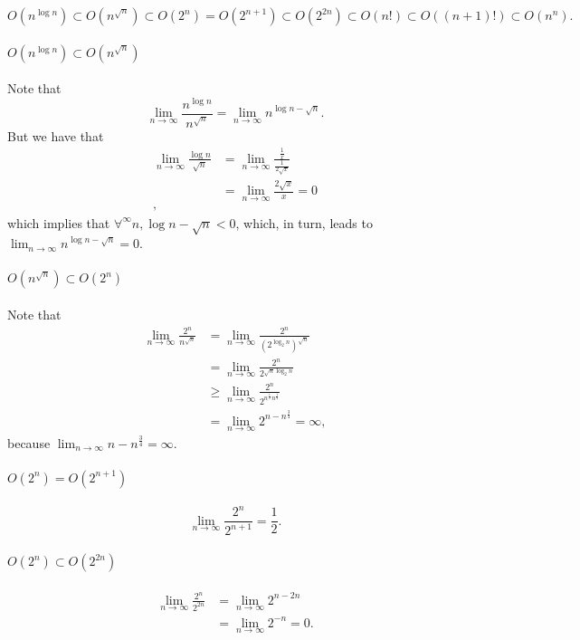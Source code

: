 \[
O(n^{\log n}) \subset O(n^{\sqrt{n}}) \subset O(2^{n}) = O(2^{n+1}) \subset O(2^{2n}) \subset O(n!) \subset O((n+1)!) \subset O(n^{n})
.\] 

\paragraph{$O(n^{\log n}) \subset O(n^{\sqrt{n}})$}
Note that\[
    \lim_{n \to \infty} \frac{n^{\log n}}{n^{\sqrt{n}}} = \lim_{n \to \infty} n^{\log n - \sqrt{n} }
.\] But we have that
\begin{align*}
    \lim_{n \to \infty} \frac{\log n}{\sqrt{n}} &= \lim_{n \to \infty} \frac{\frac{1}{x}}{\frac{1}{2\sqrt{x} }} \\
    &= \lim_{n \to \infty} \frac{2 \sqrt{x} }{x} = 0 \\
,\end{align*}
which implies that $\forall^{\infty}n, \log n - \sqrt{n} < 0 $, which, in turn, leads to $\lim_{n \to \infty} n^{\log n - \sqrt{n} }= 0$.

\paragraph{$O(n^{\sqrt{n}}) \subset O(2^{n})$}
Note that
\begin{align*}
\lim_{n \to \infty} \frac{2^{n}}{n^{\sqrt{n} }} &= \lim_{n \to \infty} \frac{2^{n}}{\left( 2^{\log_2 n} \right)^{\sqrt{n} }} \\
&= \lim_{n \to \infty} \frac{2^{n}}{2^{\sqrt{n} \log_2 n}} \\
&\ge \lim_{n \to \infty} \frac{2^{n}}{2^{n^{\frac{1}{2}} n^{\frac{1}{4}}}}  \\
&= \lim_{n \to \infty} 2^{n - n^{\frac{3}{4}}} = \infty
,\end{align*}
because $\lim_{n \to \infty} n - n^{\frac{3}{4}}=\infty$.

\paragraph{$O(2^{n}) = O(2^{n+1})$}
\[
\lim_{n \to \infty} \frac{2^{n}}{2^{n+1}} = \frac{1}{2}
.\] 

\paragraph{$O(2^{n}) \subset O(2^{2n})$}
\begin{align*}
    \lim_{n \to \infty} \frac{2^{n}}{2^{2n}} &=  \lim_{n \to \infty} 2^{n - 2n} \\
    &= \lim_{n \to \infty} 2^{-n} = 0
.\end{align*}

